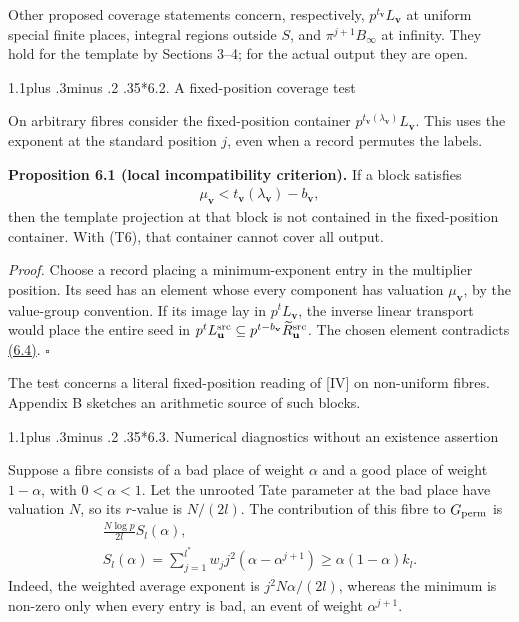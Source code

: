 \documentclass[11pt,a4paper]{amsart}
\makeatletter
\renewcommand\subsection{\@startsection{subsection}{2}{\z@}
{1.1\baselineskip plus .3\baselineskip minus .2\baselineskip}
{.35\baselineskip}{\normalfont\bfseries}}
\makeatother
\begin{document}
Other proposed coverage statements concern, respectively, $p^{t_{\mathbf v}}L_{\mathbf v}$ at uniform special finite places, integral regions outside $S$, and $\pi^{j+1}B_\infty$ at infinity. They hold for the template by Sections 3--4; for the actual output they are open.


\subsection*{6.2. A fixed-position coverage test}

On arbitrary fibres consider the fixed-position container $p^{t_{\mathbf v}(\lambda_{\mathbf v})}L_{\mathbf v}$. This uses the exponent at the standard position $j$, even when a record permutes the labels.


\par\smallskip\noindent\textbf{Proposition 6.1 (local incompatibility criterion).} If a block satisfies
\begin{equation}
\begin{gathered}
\mu_{\mathbf v}<t_{\mathbf v}(\lambda_{\mathbf v})-b_{\mathbf v},
\end{gathered}
\tag{6.4}\label{eq:6.4}
\end{equation}
then the template projection at that block is not contained in the fixed-position container. With (T6), that container cannot cover all output.


\emph{Proof.} Choose a record placing a minimum-exponent entry in the multiplier position. Its seed has an element whose every component has valuation $\mu_{\mathbf v}$, by the value-group convention. If its image lay in $p^tL_{\mathbf v}$, the inverse linear transport would place the entire seed in $p^tL^{\rm src}_{\mathbf u}\subseteq p^{t-b_{\mathbf v}}\widetilde R^{\rm src}_{\mathbf u}$. The chosen element contradicts \hyperref[eq:6.4]{(6.4)}. \hfill$\square$


The test concerns a literal fixed-position reading of [IV] on non-uniform fibres. Appendix B sketches an arithmetic source of such blocks.


\subsection*{6.3. Numerical diagnostics without an existence assertion}

Suppose a fibre consists of a bad place of weight $\alpha$ and a good place of weight $1-\alpha$, with $0<\alpha<1$. Let the unrooted Tate parameter at the bad place have valuation $N$, so its $r$-value is $N/(2l)$. The contribution of this fibre to $G_{\rm perm}$ is
\begin{equation}
\begin{gathered}
\frac{N\log p}{2l}S_l(\alpha),\\ S_l(\alpha)=\sum_{j=1}^{l^*}w_jj^2(\alpha-\alpha^{j+1})\ge\alpha(1-\alpha)k_l.
\end{gathered}
\tag{6.5}\label{eq:6.5}
\end{equation}
Indeed, the weighted average exponent is $j^2N\alpha/(2l)$, whereas the minimum is non-zero only when every entry is bad, an event of weight $\alpha^{j+1}$.
\end{document}
